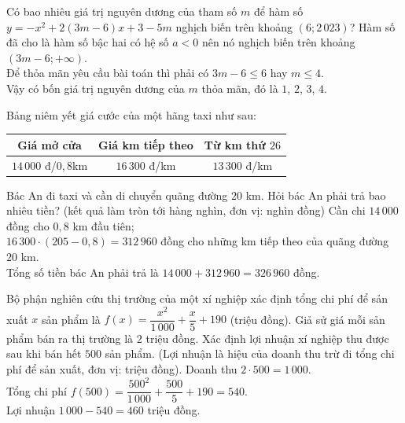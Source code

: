 \begin{ex}%
Có bao nhiêu giá trị nguyên dương của tham số $m$ để hàm số $y=-x^2+2(3m-6)x+3-5m$ nghịch biến trên khoảng $(6;2\,023)$?
\loigiai
{Hàm số đã cho là hàm số bậc hai có hệ số $a<0$ nên nó nghịch biến trên khoảng $(3m-6;+\infty)$.\\
Để thỏa mãn yêu cầu bài toán thì phải có $3m-6\le 6$ hay $m\le 4$.\\
Vậy có bốn giá trị nguyên dương của $m$ thỏa mãn, đó là $1$, $2$, $3$, $4$.}
\end{ex}

\begin{ex}%
Bảng niêm yết giá cước của một hãng taxi như sau:
\begin{center}
\begin{tabular}{|c|c|c|}
\hline
Giá mở cửa	&Giá km tiếp theo &Từ km thứ $26$\\
\hline
$14\,000$ đ/$0{,}8$km	&$16\,300$ đ/km &$13\,300$ đ/km \\
\hline
\end{tabular}
\end{center}
Bác An đi taxi và cần di chuyển quãng đường $20$ km. Hỏi bác An phải trả bao nhiêu tiền?
(kết quả làm tròn tới hàng nghìn, đơn vị: nghìn đồng)
\loigiai
{Cần chi $14\,000$ đồng cho $0{,}8$ km đầu tiên;\\
$16\,300\cdot (205-0,8)=312\,960$ đồng cho những km tiếp theo của quãng đường $20$ km.\\
Tổng số tiền bác An phải trả là $14\,000 + 312\,960 = 326\,960$ đồng.}
\end{ex}

\begin{ex}%
Bộ phận nghiên cứu thị trường của một xí nghiệp xác định tổng chi phí để sản xuất $x$ sản phẩm là $f(x)=\dfrac {x^2}{1\,000} + \dfrac{x}{5} + 190$ (triệu đồng). Giả sử giá mỗi sản phẩm bán ra thị trường là $2$ triệu đồng. Xác định lợi nhuận xí nghiệp thu được sau khi bán hết $500$ sản phẩm. (Lợi nhuận là hiệu của doanh thu trừ đi tổng chi phí để sản xuất, đơn vị: triệu đồng).
\loigiai
{Doanh thu $2\cdot 500=1\,000$.\\
Tổng chi phí $f(500)=\dfrac{500^2}{1\,000}+\dfrac {500}{5} +190=540$.\\
Lợi nhuận $1\,000-540=460$ triệu đồng.
}
\end{ex}



